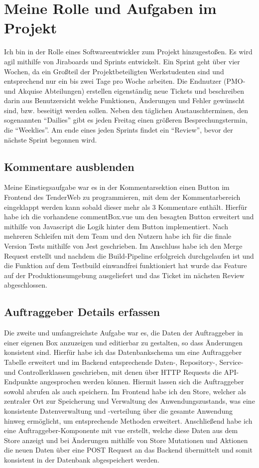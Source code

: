 \section{Meine Rolle und Aufgaben im Projekt}
Ich bin in der Rolle eines Softwareentwickler zum Projekt hinzugestoßen. Es wird agil mithilfe von Jiraboards und
Sprints entwickelt. Ein Sprint geht über vier Wochen, da ein Großteil der Projektbeteiligten Werkstudenten sind und
entsprechend nur ein bis zwei Tage pro Woche arbeiten. Die Endnutzer (PMO- und Akquise Abteilungen) erstellen
eigenständig neue Tickets und beschreiben darin aus Benutzersicht welche Funktionen, Änderungen und Fehler gewünscht
sind, bzw. beseitigt werden sollen. Neben den täglichen Austauschterminen, den sogenannten "`Dailies"' gibt es jeden
Freitag einen größeren Besprechungstermin, die "`Weeklies"'. Am ende eines jeden Sprints findet ein "`Review"', bevor der
nächste Sprint begonnen wird.

\subsection{Kommentare ausblenden}
Meine Einstiegsaufgabe war es in der Kommentarsektion einen Button im Frontend des TenderWeb zu programmieren, mit dem
der Kommentarbereich eingeklappt werden kann sobald dieser mehr als 3 Kommentare enthält. Hierfür habe ich die
vorhandene commentBox.vue um den besagten Button erweitert und mithilfe von Javascript die Logik hinter dem Button
implementiert. Nach mehreren Schleifen mit dem Team und den Nutzern habe ich für die finale Version Tests mithilfe von
Jest geschrieben. Im Anschluss habe ich den Merge Request erstellt und nachdem die Build-Pipeline erfolgreich
durchgelaufen ist und die Funktion auf dem Testbuild einwandfrei funktioniert hat wurde das Feature auf der
Produktionsumgebung ausgeliefert und das Ticket im nächsten Review abgeschlossen.

\subsection{Auftraggeber Details erfassen}
Die zweite und umfangreichste Aufgabe war es, die Daten der Auftraggeber in einer eigenen Box anzuzeigen und editierbar
zu gestalten, so dass Änderungen konsistent sind. Hierfür habe ich das Datenbankschema um eine Auftraggeber Tabelle erweitert
und im Backend entsprechende Daten-, Repository-, Service- und Controllerklassen geschrieben, mit denen über HTTP
Requests die API-Endpunkte angesprochen werden können. Hiermit lassen sich die Auftraggeber sowohl abrufen als auch speichern. Im
Frontend habe ich den Store, welcher als zentraler Ort zur Speicherung und Verwaltung des Anwendungszustands, was eine
konsistente Datenverwaltung und -verteilung über die gesamte Anwendung hinweg ermöglicht, um entsprechende Methoden
erweitert. Anschließend habe ich eine Auftraggeber-Komponente mit vue erstellt, welche diese Daten aus dem Store anzeigt und bei
Änderungen mithilfe von Store Mutationen und Aktionen die neuen Daten über eine POST Request an das Backend übermittelt
und somit konsistent in der Datenbank abgespeichert werden. 



